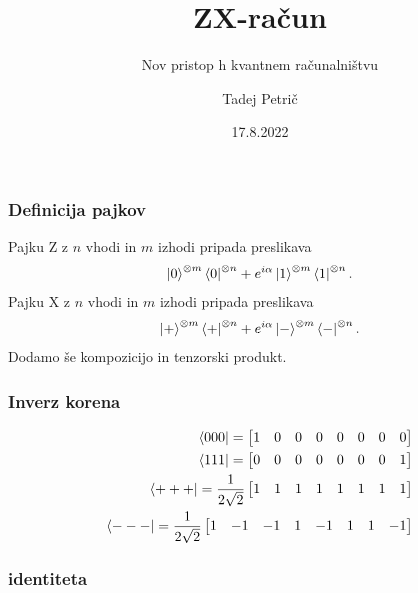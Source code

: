\documentclass[10pt]{beamer}
\title{ZX-račun}
\subtitle{Nov pristop h kvantnem računalništvu}
\date{17.8.2022}
\author{Tadej Petrič}
\institute{Fakulteta za matematiko in fiziko}
\begin{document}
\begin{frame}
  \maketitle
\end{frame}
\begin{frame}
  \frametitle{Definicija pajkov}
  Pajku Z z \(n\) vhodi in \(m\) izhodi pripada preslikava
  \begin{align*}
    \ket{0}^{\otimes m} \bra{0}^{\otimes n} + e^{i\alpha}\ket{1}^{\otimes m} \bra{1}^{\otimes n}.
\end{align*}
Pajku X z \(n\) vhodi in \(m\) izhodi pripada preslikava
\begin{align*}
  \ket{+}^{\otimes m} \bra{+}^{\otimes n} + e^{i\alpha}\ket{-}^{\otimes m} \bra{-}^{\otimes n}.
\end{align*}
Dodamo še kompozicijo in tenzorski produkt.
\end{frame}
\begin{frame}
  \frametitle{Inverz korena}
  \begin{align*}
    \bra{000} = \begin{bmatrix}
        1&0&0&0& 0&0&0&0
    \end{bmatrix}\\
    \bra{111} = \begin{bmatrix}
        0&0&0&0& 0&0&0&1
    \end{bmatrix}\\
    \bra{+++} = \frac{1}{2\sqrt{2}}\begin{bmatrix}
        1&1&1&1& 1&1&1&1
    \end{bmatrix}\\
    \bra{---} = \frac{1}{2\sqrt{2}} \begin{bmatrix}
        1&-1&-1&1& -1&1&1&-1
    \end{bmatrix}
\end{align*}
\end{frame}
\begin{frame}
  \frametitle{identiteta}
\end{frame}
\end{document}
